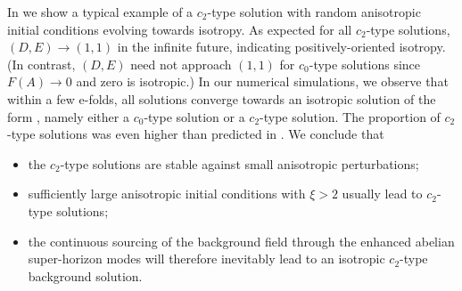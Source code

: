 In  we show a typical example of a $c_{2}$\nobreakdash-type solution with random anisotropic initial conditions evolving towards isotropy. As expected for all $c_{2}$\nobreakdash-type solutions, $(D,E)\to(1,1)$ in the infinite future, indicating positively-oriented isotropy. (In contrast, $(D,E)$ need not approach $(1,1)$ for $c_{0}$\nobreakdash-type solutions since $F(A)\to0$ and zero is isotropic.) In our numerical simulations, we observe that within a few e-folds, all solutions converge towards an isotropic solution of the form , namely either a $c_{0}$\nobreakdash-type solution or a $c_{2}$\nobreakdash-type solution. The proportion of $c_{2}$\nobreakdash-type solutions was even higher than predicted in . We conclude that 
\begin{itemize}
\item the $c_{2}$\nobreakdash-type solutions are stable against small anisotropic perturbations; 
\item sufficiently large anisotropic initial conditions with $\xi>2$ usually lead to $c_{2}$\nobreakdash-type solutions; 
\item the continuous sourcing of the background field through the enhanced abelian super-horizon modes will therefore inevitably lead to an isotropic $c_{2}$\nobreakdash-type background solution. 
\end{itemize}

